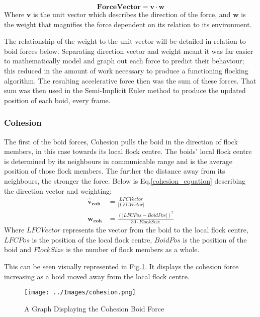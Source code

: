\begin{equation}
\boldsymbol{Force Vector} = \boldsymbol{v} \cdot \boldsymbol{w}
\label{forcevector_equation}
\end{equation}
Where $\boldsymbol{v}$ is the unit vector which describes the direction of the force, and $\boldsymbol{w}$ is the weight that magnifies the force dependent on its relation to its environment.

The relationship of the weight to the unit vector will be detailed in relation to boid forces below. Separating direction vector and weight meant it was far easier to mathematically model and graph out each force to predict their behaviour; this reduced in the amount of work necessary to produce a functioning flocking algorithm. The resulting accelerative force then was the sum of these forces. That sum was then used in the Semi-Implicit Euler method to produce the updated position of each boid, every frame.


\subsubsection{Cohesion} 
The first of the boid forces, Cohesion pulls the boid in the direction of flock members, in this case towards its local flock centre. The boids' local flock centre is determined by its neighbours in communicable range and is the average position of those flock members. The further the distance away from its neighbours, the stronger the force. Below is Eq.\ref{cohesion_equation} describing the direction vector and weighting:
\begin{equation}
\begin{split}
	\boldsymbol{\hat{v}_{coh}} &= \frac{ LFCVector} {|LFCVector|} \\
	\boldsymbol{w_{coh}} &= \frac{(|LFCPos - BoidPos|)^2} {30 \cdot FlockSize}
\end{split}
\label{cohesion_equation}
\end{equation}
Where $LFCVector$ represents the vector from the boid to the local flock centre, $LFCPos$ is the position of the local flock centre, $BoidPos$ is the position of the boid and $FlockSize$ is the number of flock members as a whole.

This can be seen visually represented in Fig.\ref{fig:cohesion}. It displays the cohesion force increasing as a boid moved away from the local flock centre.
\begin{figure}
	\texttt{[image: ../Images/cohesion.png]}
	\caption{A Graph Displaying the Cohesion Boid Force}
	\label{fig:cohesion}
\end{figure}


